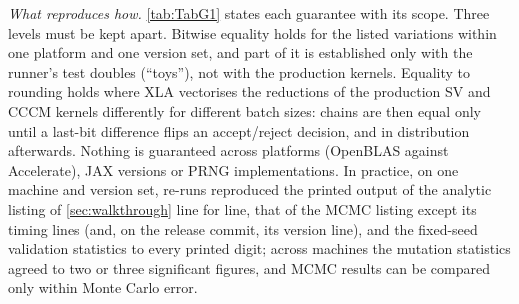 \emph{What reproduces how.}
\cref{tab:TabG1} states each guarantee with its scope.
Three levels must be kept apart.
Bitwise equality holds for the listed variations within one platform and one version set, and part
of it is established only with the runner's test doubles (``toys''), not with the production
kernels.
Equality to rounding holds where XLA vectorises the reductions of the production SV and CCCM kernels
differently for different batch sizes: chains are then equal only until a last-bit difference flips
an accept/reject decision, and in distribution afterwards.
Nothing is guaranteed across platforms (OpenBLAS against Accelerate), JAX versions or PRNG
implementations.
In practice, on one machine and version set, re-runs reproduced the printed output of the analytic
listing of \cref{sec:walkthrough} line for line, that of the MCMC listing except its timing
lines (and, on the release commit, its version line), and the fixed-seed validation statistics
to every printed digit; across machines the
mutation statistics agreed to two or three significant figures, and MCMC results can be compared
only within Monte Carlo error.

